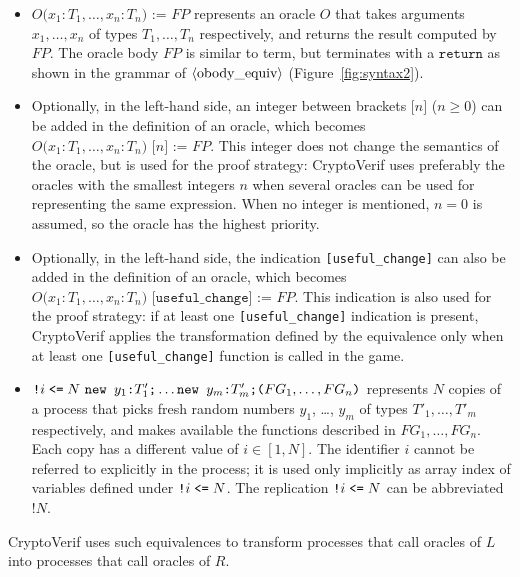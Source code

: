 \begin{itemize}
\begin{itemize}
\item $O\texttt{(}x_1:T_1, \ldots, x_n:T_n\texttt{) := }\mathit{FP}$ represents
an oracle $O$ that takes arguments $x_1, \ldots, x_n$ of types
$T_1, \ldots, T_n$ respectively, and returns the result computed by $\mathit{FP}$.
The oracle body $\mathit{FP}$ is similar to term, but terminates with
a $\texttt{return}$ as shown in the grammar of $\langle\textrm{obody\_equiv}\rangle$ 
(Figure~\ref{fig:syntax2}).

\item Optionally, in the left-hand side,
an integer between brackets $\texttt{[}n\texttt{]}$ ($n \geq 0$)
can be added in the definition of an oracle, which becomes 
$O\texttt{(}x_1:T_1, \ldots, x_n:T_n\texttt{) [}n\texttt{] := }\mathit{FP}$.
This integer does not change the semantics of the oracle, but is
used for the proof strategy: CryptoVerif uses preferably the oracles
with the smallest integers $n$ when several oracles can be used
for representing the same expression. When no integer is mentioned,
$n = 0$ is assumed, so the oracle has the highest priority.

\item Optionally, in the left-hand side, 
the indication \texttt{[useful\_change]} can also
be added in the definition of an oracle, which becomes 
$O\texttt{(}x_1:T_1, \ldots, x_n:T_n\texttt{) [useful\_change] := }\mathit{FP}$.
This indication is also used for the proof strategy: 
if at least one \texttt{[useful\_change]} indication is present,
CryptoVerif applies the transformation defined by the equivalence
only when at least one \texttt{[useful\_change]} function is called in the game.

\item $\texttt{!} i \leqt  N\ \Resa{y_1}{T'_1}\texttt{;}
\ldots \Resa{y_m}{T'_m} \texttt{;} \texttt{(}FG_1, \ldots,
FG_n\texttt{)}$ represents $N$ copies of a process that picks fresh
random numbers $y_1$, \ldots, $y_m$ of types $T'_1, \ldots, T'_m$
respectively, and makes available the functions described in $FG_1,
\ldots, FG_n$. Each copy has a different value of $i \in [1, N]$. The
identifier $i$ cannot be referred to explicitly in the process; it is
used only implicitly as array index of variables defined under
$\texttt{!} i \mathrel{\texttt{<=}}  N$.  The replication $\texttt{!} i
\mathrel{\texttt{<=}}  N$ can be abbreviated $\texttt{!} N$.

\end{itemize}
CryptoVerif uses such equivalences to transform processes that call
oracles of $L$ into processes that call oracles of $R$.


\end{itemize}
